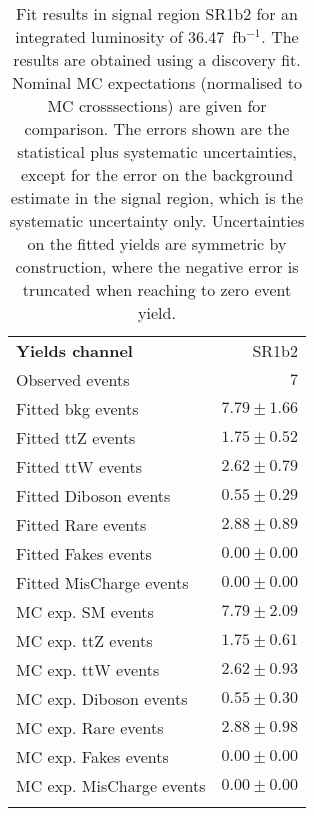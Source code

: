 

\begin{table}
\begin{center}
\setlength{\tabcolsep}{0.0pc}
{\small
\begin{tabular*}{\textwidth}{@{\extracolsep{\fill}}lr}
\noalign{\smallskip}\hline\noalign{\smallskip}
{\bfseries Yields channel}           & SR1b2              \\[-0.05cm]
\noalign{\smallskip}\hline\noalign{\smallskip}
Observed events          & $7$                    \\
\noalign{\smallskip}\hline\noalign{\smallskip}
Fitted bkg events         & $7.79 \pm 1.66$              \\
\noalign{\smallskip}\hline\noalign{\smallskip}
        Fitted ttZ events         & $1.75 \pm 0.52$              \\
        Fitted ttW events         & $2.62 \pm 0.79$              \\
        Fitted Diboson events         & $0.55 \pm 0.29$              \\
        Fitted Rare events         & $2.88 \pm 0.89$              \\
        Fitted Fakes events         & $0.00 \pm 0.00$              \\
        Fitted MisCharge events         & $0.00 \pm 0.00$              \\
 \noalign{\smallskip}\hline\noalign{\smallskip}
MC exp. SM events              & $7.79 \pm 2.09$              \\
\noalign{\smallskip}\hline\noalign{\smallskip}
        MC exp. ttZ events         & $1.75 \pm 0.61$              \\
        MC exp. ttW events         & $2.62 \pm 0.93$              \\
        MC exp. Diboson events         & $0.55 \pm 0.30$              \\
        MC exp. Rare events         & $2.88 \pm 0.98$              \\
        MC exp. Fakes events         & $0.00 \pm 0.00$              \\
        MC exp. MisCharge events         & $0.00 \pm 0.00$              \\
\noalign{\smallskip}\hline\noalign{\smallskip}
\end{tabular*}
}
\end{center}
\caption{Fit results in signal region SR1b2 for an integrated luminosity of 36.47~fb$^{-1}$.
The results are obtained using a discovery fit. Nominal MC expectations (normalised to MC crosssections) are given for comparison. 
The errors shown are the statistical plus systematic uncertainties, except for the error on the background estimate in the signal region, which is the systematic uncertainty only.
Uncertainties on the fitted yields are symmetric by construction, where the negative error is truncated when reaching to zero event yield.
}
\label{table.results.systematics.in.logL.fit..Yields.SR1b2}
\end{table}
\clearpage
%